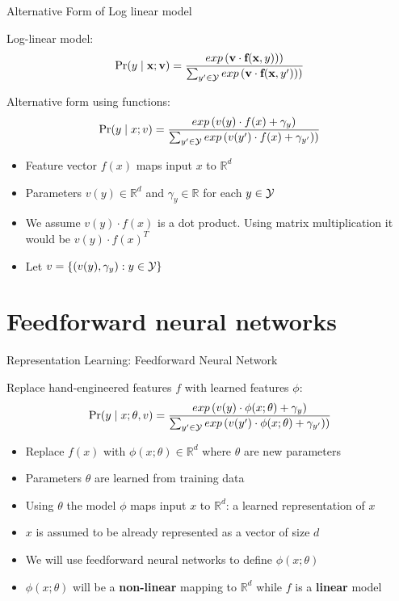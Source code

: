 \begin{frame}{Alternative Form of Log linear model}
\begin{block}{Log-linear model:}
\[ \Pr(y \mid \textbf{x}; \textbf{v}) = \frac{exp\left(\textbf{v} \cdot \textbf{f}(\textbf{x}, y))\right)}{\sum_{y' \in {\cal Y}} exp\left(\textbf{v} \cdot \textbf{f}(\textbf{x}, y'))\right)} \]
\end{block}

\begin{block}{Alternative form using functions:}
\[ \Pr(y \mid x; v) = \frac{exp\left(v(y) \cdot f(x) + \gamma_y \right)}{\sum_{y' \in {\cal Y}} exp\left(v(y') \cdot f(x) + \gamma_{y'})\right)} \]
\end{block}

\begin{itemize}[<+->]
\item Feature vector $f(x)$ maps input $x$ to $\mathbb{R}^d$
\item Parameters $v(y) \in \mathbb{R}^d$ and $\gamma_y \in \mathbb{R}$ for each $y \in {\cal Y}$
\item We assume $v(y) \cdot f(x)$ is a dot product. Using matrix multiplication it would be $v(y) \cdot f(x)^T$
\item Let $v = \{ (v(y), \gamma_y) : y \in {\cal Y} \} $
\end{itemize}
\end{frame}

\section{Feedforward neural networks}
\frame{\tableofcontents[currentsection]}

\begin{frame}{Representation Learning: Feedforward Neural Network}
\begin{block}{Replace hand-engineered features $f$ with learned features $\phi$:}
\[ \Pr(y \mid x; \theta, v) = \frac{exp\left(v(y) \cdot \phi(x;\theta) + \gamma_y \right)}{\sum_{y' \in {\cal Y}} exp\left(v(y') \cdot \phi(x;\theta) + \gamma_{y'})\right)} \]
\end{block}

\begin{itemize}[<+->]
\item Replace $f(x)$ with $\phi(x;\theta) \in \mathbb{R}^d$ where $\theta$ are new parameters
\item Parameters $\theta$ are learned from training data
\item Using $\theta$ the model $\phi$ maps input $x$ to $\mathbb{R}^d$: a learned representation of $x$
\item $x$ is assumed to be already represented as a vector of size $d$
\item We will use feedforward neural networks to define $\phi(x;\theta)$
\item $\phi(x;\theta)$ will be a \textbf{non-linear} mapping to $\mathbb{R}^d$ while $f$ is a \textbf{linear} model
\end{itemize}
\end{frame}

